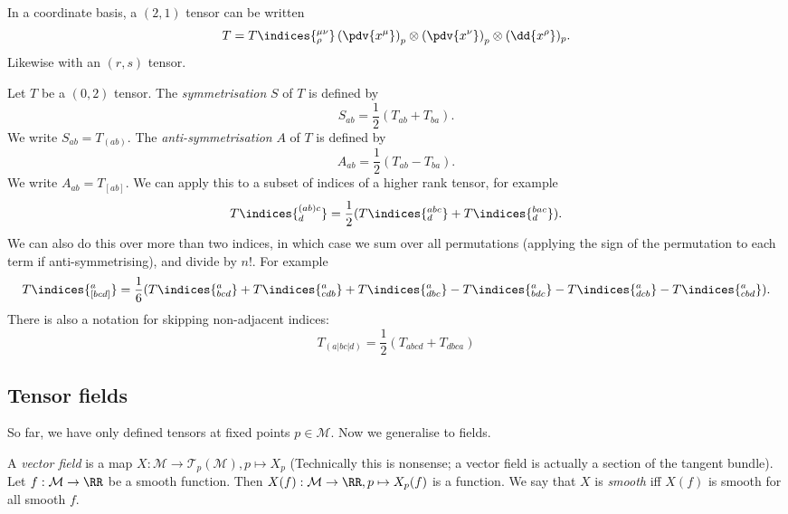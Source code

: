 \documentclass{jknotes}
\begin{document}
\begin{eg}
    In a coordinate basis, a \((2,1)\) tensor can be written
    \begin{equation}
        T = T\indices{^{\mu\nu}_\rho}\left(\pdv{x^\mu}\right)_p\otimes\left(\pdv{x^\nu}\right)_p\otimes(\dd{x^\rho})_p.
    \end{equation}
    Likewise with an \((r,s)\) tensor.
\end{eg}

\begin{defn}
    Let \(T\) be a \((0,2)\) tensor. The \emph{symmetrisation} \(S\) of \(T\) is defined by
    \begin{equation}
        S_{ab} = \frac12(T_{ab}+T_{ba}).
    \end{equation}
    We write \(S_{ab} = T_{(ab)}\). The \emph{anti-symmetrisation} \(A\) of \(T\) is defined by
    \begin{equation}
        A_{ab} = \frac12(T_{ab}-T_{ba}).
    \end{equation}
    We write \(A_{ab} = T_{[ab]}\). We can apply this to a subset of indices of a higher rank tensor, for example
    \begin{equation}
        T\indices{^{(ab)c}_d} = \frac12(T\indices{^{abc}_d} + T\indices{^{bac}_d}).
    \end{equation}
    We can also do this over more than two indices, in which case we sum over all permutations (applying the sign of the permutation to each term if anti-symmetrising), and divide by \(n!\). For example
    \begin{equation}
        T\indices{^a_{[bcd]}} = \frac16(T\indices{^a_{bcd}} + T\indices{^a_{cdb}} + T\indices{^a_{dbc}} 
        - T\indices{^a_{bdc}} - T\indices{^a_{dcb}} - T\indices{^a_{cbd}}).
    \end{equation}
    There is also a notation for skipping non-adjacent indices:
    \begin{equation}
        T_{(a|bc|d)} = \frac12(T_{abcd}+T_{dbca})
    \end{equation}
\end{defn}

\subsection{Tensor fields}
So far, we have only defined tensors at fixed points \(p\in \mathcal{M}\). Now we generalise to fields.
\begin{defn}
    A \emph{vector field} is a map \(X:\mathcal{M}\to\mathcal{T}_p(\mathcal{M}),p\mapsto X_p\) (Technically this is nonsense; a vector field is actually a section of the tangent bundle). Let \(f:\mathcal{M}\to\RR\) be a smooth function. Then \(X(f):\mathcal{M}\to\RR,p\mapsto X_p(f)\) is a function. We say that \(X\) is \emph{smooth} iff \(X(f)\) is smooth for all smooth \(f\).
\end{defn}
\end{document}

